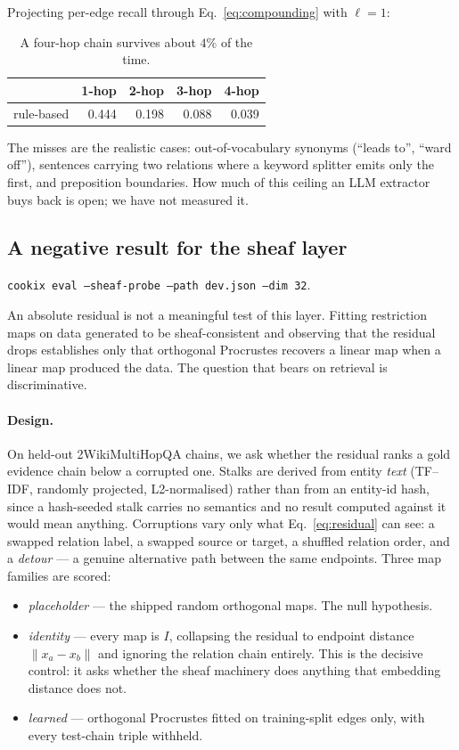 \documentclass[11pt]{article}
\theoremstyle{definition}
\newcommand{\cmd}[1]{\texttt{\small #1}}
\begin{document}
Projecting per-edge recall through Eq.~\eqref{eq:compounding} with $\ell=1$:

\begin{table}[h]
\centering
\begin{tabular}{lrrrr}
\toprule
& 1-hop & 2-hop & 3-hop & 4-hop \\
\midrule
rule-based & 0.444 & 0.198 & 0.088 & 0.039 \\
\bottomrule
\end{tabular}
\caption{A four-hop chain survives about $4\%$ of the time.}
\end{table}

The misses are the realistic cases: out-of-vocabulary synonyms (``leads to'', ``ward
off''), sentences carrying two relations where a keyword splitter emits only the first,
and preposition boundaries. How much of this ceiling an LLM extractor buys back is open;
we have not measured it.

\subsection{A negative result for the sheaf layer}
\label{sec:sheaf-negative}

\cmd{cookix eval --sheaf-probe --path dev.json --dim 32}.

An absolute residual is not a meaningful test of this layer. Fitting restriction maps on
data generated to be sheaf-consistent and observing that the residual drops establishes
only that orthogonal Procrustes recovers a linear map when a linear map produced the
data. The question that bears on retrieval is discriminative.

\paragraph{Design.} On held-out 2WikiMultiHopQA chains, we ask whether the residual
ranks a gold evidence chain below a corrupted one. Stalks are derived from entity
\emph{text} (TF--IDF, randomly projected, L2-normalised) rather than from an entity-id
hash, since a hash-seeded stalk carries no semantics and no result computed against it
would mean anything. Corruptions vary only what Eq.~\eqref{eq:residual} can see: a
swapped relation label, a swapped source or target, a shuffled relation order, and a
\emph{detour} --- a genuine alternative path between the same endpoints. Three map
families are scored:

\begin{itemize}
  \item \emph{placeholder} --- the shipped random orthogonal maps. The null hypothesis.
  \item \emph{identity} --- every map is $I$, collapsing the residual to endpoint
  distance $\lVert x_a-x_b\rVert$ and ignoring the relation chain entirely. This is the
  decisive control: it asks whether the sheaf machinery does anything that embedding
  distance does not.
  \item \emph{learned} --- orthogonal Procrustes fitted on training-split edges only,
  with every test-chain triple withheld.
\end{itemize}
\end{document}
